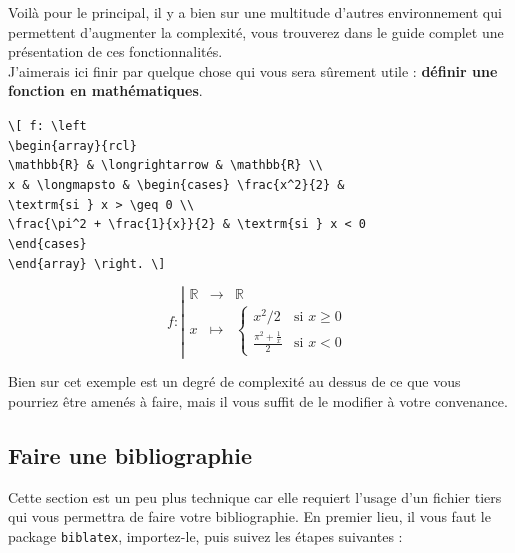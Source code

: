 \documentclass[11pt]{article}				%
\begin{document}
Voilà pour le principal, il y a bien sur une multitude d'autres environnement qui permettent d'augmenter la complexité, vous trouverez dans le guide complet une présentation de ces fonctionnalités. \\
J'aimerais ici finir par quelque chose qui vous sera sûrement utile : \textbf{définir une fonction en mathématiques}.
\begin{multicols}{2}
	
\verb|\[ f: \left | \\
\verb|\begin{array}{rcl}| \\
\verb|\mathbb{R} & \longrightarrow & \mathbb{R} \\|	\\
\verb|x & \longmapsto & \begin{cases} \frac{x^2}{2} &| \\ \verb|\textrm{si } x > \geq 0 \\| \\
\verb|\frac{\pi^2 + \frac{1}{x}}{2} & \textrm{si } x < 0 | \\ 
\verb|\end{cases}| \\
\verb|\end{array} \right. \]|
	
\columnbreak	

\[
f: \left|
\begin{array}{rcl}
	\mathbb{R} & \longrightarrow & \mathbb{R} \\
	x & \longmapsto & \begin{cases} x^2/2 & \textrm{si } x \geq 0 \\
	\frac{\pi^2 + \frac{1}{x}}{2} & \textrm{si } x < 0 \end{cases}
\end{array} \right. \]
\end{multicols}

Bien sur cet exemple est un degré de complexité au dessus de ce que vous pourriez être amenés à faire, mais il vous suffit de le modifier à votre convenance.


\clearpage

\subsection*{Faire une bibliographie}

Cette section est un peu plus technique car elle requiert l'usage d'un fichier tiers qui vous permettra de faire votre bibliographie. En premier lieu, il vous faut le package \verb|biblatex|, importez-le, puis suivez les étapes suivantes :
\end{document}
